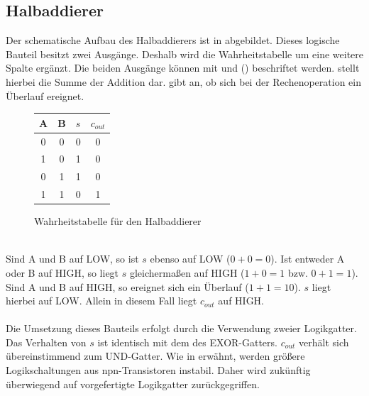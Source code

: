 \subsection{Halbaddierer}
Der schematische Aufbau des Halbaddierers ist in \cite{zimmermann1998binary} abgebildet. Dieses logische Bauteil besitzt zwei Ausgänge. Deshalb wird die Wahrheitstabelle um eine weitere Spalte ergänzt. Die beiden Ausgänge können mit  und  () beschriftet werden.  stellt hierbei die Summe der Addition dar.  gibt an, ob sich bei der Rechenoperation ein Überlauf ereignet.\\
\begin{figure}[h]
	\centering
	\hspace{1cm}
	\begin{tabular}{|c|c|c|c|}
		\hline
		\textbf{A} & \textbf{B} & \textbf{$s$} & \textbf{$c_{out}$} \\
		\hline
		0 & 0 & 0 & 0 \\
		1 & 0 & 1 & 0 \\
		0 & 1 & 1 & 0 \\
		1 & 1 & 0 & 1 \\
		\hline
	\end{tabular}
	\caption{Wahrheitstabelle für den Halbaddierer}
\end{figure}\\
Sind A und B auf LOW, so ist $s$ ebenso auf LOW ($0+0=0$). Ist entweder A oder B auf HIGH, so liegt $s$ gleichermaßen auf HIGH ($1+0=1$ bzw. $0+1=1$). Sind A und B auf HIGH, so ereignet sich ein Überlauf ($1+1=10$). $s$ liegt hierbei auf LOW. Allein in diesem Fall liegt $c_{out}$ auf HIGH.\\\\
Die Umsetzung dieses Bauteils erfolgt durch die Verwendung zweier Logikgatter. Das Verhalten von $s$ ist identisch mit dem des EXOR-Gatters. $c_{out}$ verhält sich übereinstimmend zum UND-Gatter. Wie in  erwähnt, werden größere Logikschaltungen aus npn-Transistoren instabil. Daher wird zukünftig überwiegend auf vorgefertigte Logikgatter zurückgegriffen.\\
\newpage
